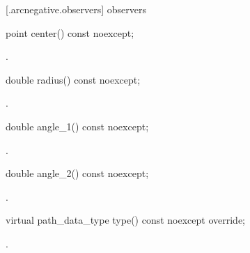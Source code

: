  [\iotwod.arcnegative.observers]{ observers}

\begin{itemdecl}
    point center() const noexcept;
\end{itemdecl}
\begin{itemdescr}
	\pnum
	\returns
	.

\end{itemdescr}

\begin{itemdecl}
    double radius() const noexcept;
\end{itemdecl}
\begin{itemdescr}
	\pnum
	\returns
	.

\end{itemdescr}

\begin{itemdecl}
    double angle_1() const noexcept;
\end{itemdecl}
\begin{itemdescr}
	\pnum
	\returns
	.

\end{itemdescr}

\begin{itemdecl}
    double angle_2() const noexcept;
\end{itemdecl}
\begin{itemdescr}
	\pnum
	\returns
	.

\end{itemdescr}

\begin{itemdecl}
    virtual path_data_type type() const noexcept override;
\end{itemdecl}
\begin{itemdescr}
	\pnum
	\returns
	.

\end{itemdescr}
